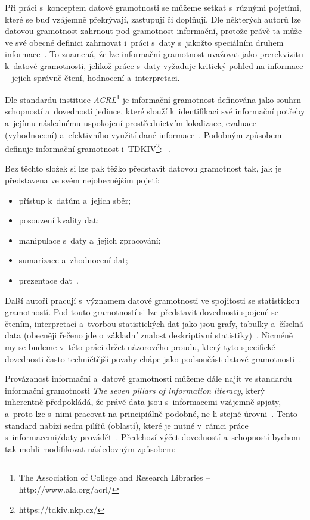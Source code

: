 Při práci s~konceptem datové gramotnosti se můžeme setkat s~různými pojetími, které se buď vzájemně překrývají, zastupují či doplňují. Dle některých autorů lze datovou gramotnost zahrnout pod gramotnost informační, protože právě ta může ve své obecné definici zahrnovat i~práci s~daty s~jakožto speciálním druhem informace~\parencite[126]{calzada13}. To znamená, že lze informační gramotnost uvažovat jako prerekvizitu k~datové gramotnosti, jelikož práce s~daty vyžaduje kritický pohled na informace -- jejich správně čtení, hodnocení a~interpretaci.

Dle standardu instituce \emph{ACRL}\footnote{The Association of College and Research Libraries – http://www.ala.org/acrl/} je informační gramotnost definována jako souhrn schopností a~dovedností jedince, které slouží k~identifikaci své informační potřeby a~jejímu následnému uspokojení prostřednictvím lokalizace, evaluace (vyhodnocení) a~efektivního využití dané informace~\parencite[2]{acrl14}. Podobným způsobem definuje informační gramotnost i~TDKIV\footnote{https://tdkiv.nkp.cz/}: ~\parencite{tdkiv03}.

Bez těchto složek si lze pak těžko představit datovou gramotnost tak, jak je představena ve svém nejobecnějším pojetí:

\begin{itemize}
\tightlist
\item
  přístup k~datům a~jejich sběr;
\item
  posouzení kvality dat;
\item
  manipulace s~daty a~jejich zpracování;
\item
  sumarizace a~zhodnocení dat;
\item
  prezentace dat~\parencite[8]{schield05}.
\end{itemize}

Další autoři pracují s~významem datové gramotnosti ve spojitosti se statistickou gramotností. Pod touto gramotností si lze představit dovednosti spojené se čtením, interpretací a~tvorbou statistických dat jako jsou grafy, tabulky a~číselná data (obecněji řečeno jde o~základní znalost deskriptivní statistiky)~\parencite[8]{schield05}. Nicméně my se budeme v~této práci držet názorového proudu, který tyto specifické dovednosti často techničtější povahy chápe jako podsoučást datové gramotnosti~\parencite[125]{calzada13}.

Provázanost informační a~datové gramotnosti můžeme dále najít ve standardu informační gramotnosti \emph{The seven pillars of information literacy}, který inherentně předpokládá, že právě data jsou s~informacemi vzájemně spjaty, a~proto lze s~nimi pracovat na principiálně podobné, ne-li stejné úrovni~\parencite[126]{calzada13}. Tento standard nabízí sedm pilířů (oblastí), které je nutné v~rámci práce s~informacemi/daty provádět~\parencite{sconul11}. Předchozí výčet dovedností a~schopností bychom tak mohli modifikovat následovným způsobem:

